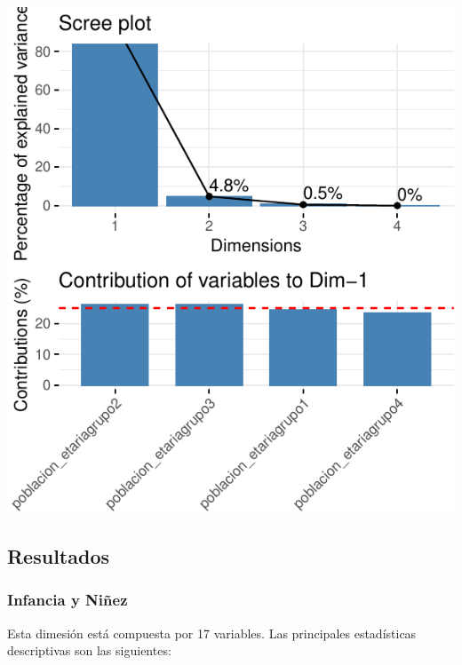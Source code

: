 \includegraphics{Anexo_PCA_files/figure-latex/unnamed-chunk-1-7.pdf}

\hypertarget{resultados}{%
\subsection{Resultados}\label{resultados}}

\hypertarget{infancia-y-niuxf1ez}{%
\subsubsection{Infancia y Niñez}\label{infancia-y-niuxf1ez}}

Esta dimesión está compuesta por 17 variables. Las principales
estadísticas descriptivas son las siguientes:

